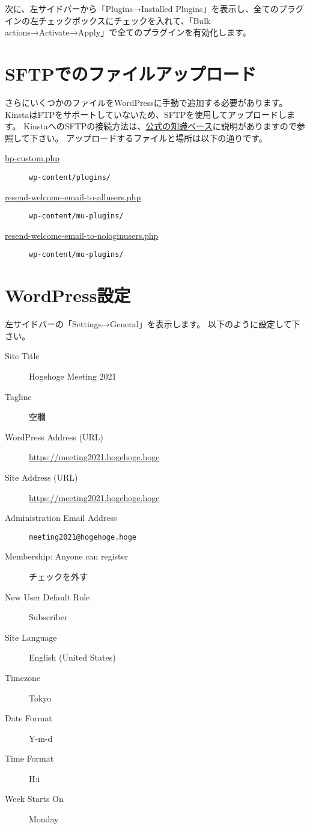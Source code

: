 \documentclass[titlepage,10pt,a4paper,uplatex]{jsbook}
\begin{document}
次に、左サイドバーから「Plugins→Installed Plugins」を表示し、全てのプラグインの左チェックボックスにチェックを入れて、「Bulk actions→Activate→Apply」で全てのプラグインを有効化します。

\section{SFTPでのファイルアップロード}

さらにいくつかのファイルをWordPressに手動で追加する必要があります。
KinstaはFTPをサポートしていないため、SFTPを使用してアップロードします。
KinstaへのSFTPの接続方法は、\href{https://kinsta.com/jp/knowledgebase/how-to-use-sftp/}{公式の知識ベース}に説明がありますので参照して下さい。
アップロードするファイルと場所は以下の通りです。

\begin{description}
\item[\href{https://github.com/astanabe/OnlineAnnualMeeting/blob/main/bp-custom.php}{bp-custom.php}] \texttt{wp-content/plugins/}
\item[\href{https://github.com/astanabe/OnlineAnnualMeeting/blob/main/resend-welcome-email-to-allusers.php}{resend-welcome-email-to-allusers.php}] \texttt{wp-content/mu-plugins/}
\item[\href{https://github.com/astanabe/OnlineAnnualMeeting/blob/main/resend-welcome-email-to-nologinusers.php}{resend-welcome-email-to-nologinusers.php}] \texttt{wp-content/mu-plugins/}
\end{description}

\section{WordPress設定}

左サイドバーの「Settings→General」を表示します。
以下のように設定して下さい。

\begin{description}
\item[Site Title] Hogehoge Meeting 2021
\item[Tagline] 空欄
\item[WordPress Address (URL)] \url{https://meeting2021.hogehoge.hoge}
\item[Site Address (URL)] \url{https://meeting2021.hogehoge.hoge}
\item[Administration Email Address] \texttt{meeting2021@hogehoge.hoge}
\item[Membership: Anyone can register] チェックを外す
\item[New User Default Role] Subscriber
\item[Site Language] English (United States)
\item[Timezone] Tokyo
\item[Date Format] Y-m-d
\item[Time Format] H:i
\item[Week Starts On] Monday
\end{description}
\end{document}
